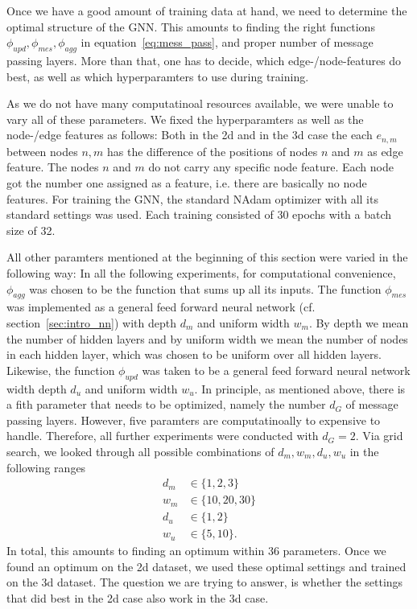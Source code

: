 \label{sec:implGNNBravais}
Once we have a good amount of training data at hand, we need to determine the optimal structure of the GNN. 
This amounts to finding the right functions $\phi_{upd},\phi_{mes},\phi_{agg}$ in equation~\ref{eq:mess_pass}, 
and proper number of message passing layers. More than that, one has to decide, which edge-/node-features 
do best, as well as which hyperparamters to use during training.

As we do not have many computatinoal resources available, we were unable to vary all of these parameters.
We fixed the hyperparamters as well as the node-/edge features as follows: Both in the 2d and in the 3d case
the each $e_{n,m}$ between nodes $n,m$ has the difference of the positions of nodes $n$ and $m$ as edge feature.
The nodes $n$ and $m$ do not carry any specific node feature. Each node got the number one assigned as 
a feature, i.e. there are basically no node features.
For training the GNN, the standard NAdam optimizer with all its standard settings was used. Each training consisted 
of 30 epochs with a batch size of 32.

All other paramters mentioned at the beginning of this section were varied in the following way:
In all the following experiments, for computational convenience, $\phi_{agg}$ was chosen to be the function that sums up all its inputs.
The function $\phi_{mes}$ was implemented as a general feed forward neural network (cf. section~\ref{sec:intro_nn}) with 
depth $d_m$ and uniform width $w_m$. By depth we mean the number of hidden layers and by uniform width we mean the number of nodes
in each hidden layer, which was chosen to be uniform over all hidden layers.
Likewise, the function $\phi_{upd}$ was taken to be a general feed forward neural network width depth $d_u$ and uniform width $w_u$.
In principle, as mentioned above, there is a fith parameter that needs to be optimized, namely the number $d_G$ of message
passing layers. However, five paramters are computatinoally to expensive to handle. Therefore,
all further experiments were conducted with $d_G=2$. Via grid search, we looked through all possible combinations
of $d_m,w_m,d_u,w_u$ in the following ranges
\begin{align*}
    d_m&\in\{1, 2, 3\} \\
    w_m&\in\{10, 20, 30\} \\
    d_u&\in\{1,2\} \\
    w_u&\in\{5, 10\}.   
\end{align*}
In total, this amounts to finding an optimum within 36 parameters. Once we found an optimum on the 2d dataset, we used
these optimal settings and trained on the 3d dataset. The question we are trying to answer, is whether the settings that did best
in the 2d case also work in the 3d case.

